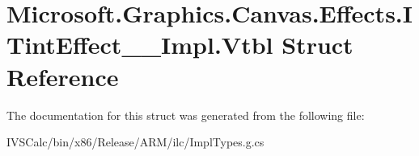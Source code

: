 \hypertarget{struct_microsoft_1_1_graphics_1_1_canvas_1_1_effects_1_1_i_tint_effect_____impl_1_1_vtbl}{}\section{Microsoft.\+Graphics.\+Canvas.\+Effects.\+I\+Tint\+Effect\+\_\+\+\_\+\+Impl.\+Vtbl Struct Reference}
\label{struct_microsoft_1_1_graphics_1_1_canvas_1_1_effects_1_1_i_tint_effect_____impl_1_1_vtbl}


The documentation for this struct was generated from the following file\+:\begin{DoxyCompactItemize}
\item 
I\+V\+S\+Calc/bin/x86/\+Release/\+A\+R\+M/ilc/Impl\+Types.\+g.\+cs\end{DoxyCompactItemize}
